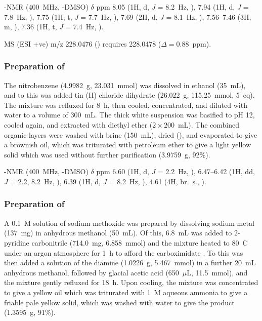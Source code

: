 \begin{refsection}
-NMR (400~MHz, -DMSO) $\delta$ ppm 8.05 (1H, d, \textit{J} = 8.2~Hz, ), 7.94 (1H, d, \textit{J} = 7.8~Hz, ), 7.75 (1H, t, \textit{J} = 7.7~Hz, ), 7.69 (2H, d, \textit{J} = 8.1~Hz, ), 7.56--7.46 (3H, m, ), 7.36 (1H, t, \textit{J} = 7.4~Hz, ).

MS (ESI +ve) m/z 228.0476 ()  requires 228.0478 ($\Delta=0.88$~ppm).

\subsubsection{Preparation of }
The nitrobenzene (4.9982~g, 23.031~mmol) was dissolved in ethanol (35~mL), and to this was added tin (II) chloride dihydrate (26.022~g, 115.25~mmol, 5~eq).
The mixture was refluxed for 8~h, then cooled, concentrated, and diluted with water to a volume of 300~mL.
The thick white suspension was basified to pH 12, cooled again, and extracted with diethyl ether ($2\times200$~mL).
The combined organic layers were washed with brine (150~mL), dried (), and evaporated to give a brownish oil, which was triturated with petroleum ether to give a light yellow solid which was used without further purification (3.9759~g, 92\%).\autocite{Urban2011}

-NMR (400~MHz, -DMSO) $\delta$ ppm 6.60 (1H, d, \textit{J} = 2.2~Hz, ), 6.47--6.42 (1H, dd, \textit{J} = 2.2, 8.2~Hz, ), 6.39 (1H, d, \textit{J} = 8.2~Hz, ), 4.61 (4H, br.\ s., ).

\subsubsection{Preparation of }
A 0.1~M solution of sodium methoxide was prepared by dissolving sodium metal (137~mg) in anhydrous methanol (50~mL).
Of this, 6.8~mL was added to 2-pyridine carbonitrile (714.0~mg, 6.858~mmol) and the mixture heated to 80~\degree{}C under an argon atmosphere for 1~h to afford the carboximidate .
To this was then added a solution of the diamine  (1.0226~g, 5.467~mmol) in a further 20~mL anhydrous methanol, followed by glacial acetic acid (650~$\mu$L, 11.5~mmol), and the mixture gently refluxed for 18~h.
Upon cooling, the mixture was concentrated to give a yellow oil which was triturated with 1~M aqueous ammonia to give a friable pale yellow solid, which was washed with water to give the product (1.3595~g, 91\%).\autocite{Conn2011}


\end{refsection}
